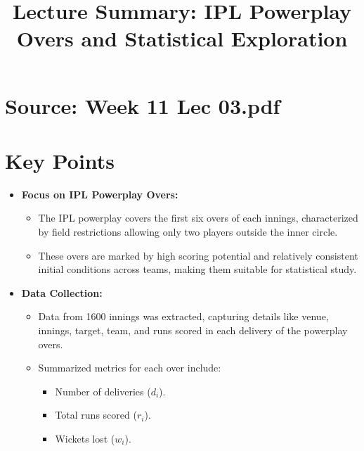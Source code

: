 \documentclass{article}
\title{Lecture Summary: IPL Powerplay Overs and Statistical Exploration}
\author{}
\date{}
\begin{document}
\maketitle

\section*{Source: Week 11 Lec 03.pdf}

\section*{Key Points}

\begin{itemize}
  \item \textbf{Focus on IPL Powerplay Overs:}
    \begin{itemize}
      \item The IPL powerplay covers the first six overs of each innings, characterized by field restrictions allowing only two players outside the inner circle.
      \item These overs are marked by high scoring potential and relatively consistent initial conditions across teams, making them suitable for statistical study.
    \end{itemize}

  \item \textbf{Data Collection:}
    \begin{itemize}
      \item Data from 1600 innings was extracted, capturing details like venue, innings, target, team, and runs scored in each delivery of the powerplay overs.
      \item Summarized metrics for each over include:
        \begin{itemize}
          \item Number of deliveries ($d_i$).
          \item Total runs scored ($r_i$).
          \item Wickets lost ($w_i$).
        \end{itemize}
    \end{itemize}


\end{itemize}
\end{document}
